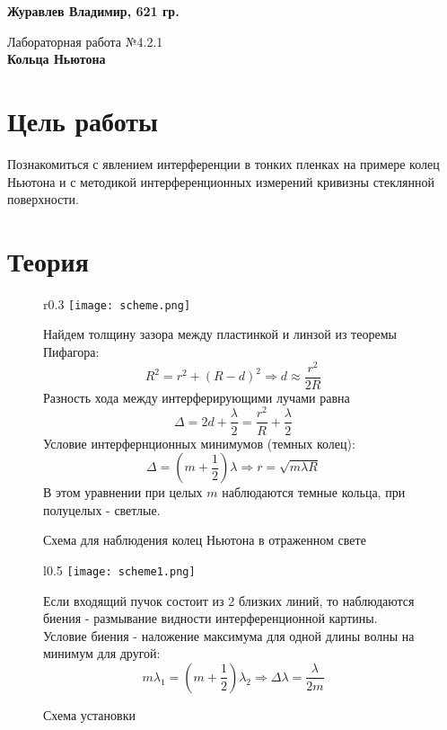 \documentclass[10pt,a4paper]{article}
\begin{document}
\begin{flushright}

\textbf{Журавлев Владимир, 621 гр.\\}

\end{flushright}
\begin{center}
\begin{LARGE}

\vspace{\baselineskip}
Лабораторная работа №4.2.1\\
\textbf{
Кольца Ньютона}\\
\vspace{\baselineskip}

\end{LARGE}
\end{center}


\section*{Цель работы}
Познакомиться с явлением интерференции в тонких пленках на примере колец Ньютона и с методикой интерференционных измерений кривизны стеклянной поверхности.
\section*{Теория}
\begin{figure}[h]
\begin{wrapfigure}{r}{0.3\textwidth}
\centering
\texttt{[image: scheme.png]}
\caption{Схема для наблюдения колец Ньютона в отраженном свете}
\end{wrapfigure}
Найдем толщину зазора между пластинкой и линзой из теоремы Пифагора:
\begin{equation}
R^2 = r^2 + (R-d)^2 \Rightarrow d \approx \dfrac{r^2}{2R}
\end{equation}
Разность хода между интерферирующими лучами равна
\begin{equation}
\Delta = 2d + \dfrac{\lambda}{2} = \dfrac{r^2}{R} + \dfrac{\lambda}{2}
\end{equation}
Условие интерфернционных минимумов (темных колец):
\begin{equation}
\Delta = \left(m+\dfrac{1}{2}\right)\lambda \Rightarrow r = \sqrt{m\lambda R}
\end{equation}
В этом уравнении при целых $m$ наблюдаются темные кольца, при полуцелых - светлые.
\end{figure}

\begin{figure}[h]
\begin{wrapfigure}{l}{0.5\textwidth}
\centering
\texttt{[image: scheme1.png]}
\caption{Схема установки}
\end{wrapfigure}
Если входящий пучок состоит из 2 близких линий, то наблюдаются биения - размывание видности интерференционной картины. Условие биения - наложение максимума для одной длины волны на минимум для другой:
\begin{equation}
m\lambda_1 = \left(m+\dfrac{1}{2}\right)\lambda_2 \Rightarrow \Delta\lambda = \dfrac{\lambda}{2m}
\label{oscil}
\end{equation}
\end{figure}
\clearpage
\end{document}
